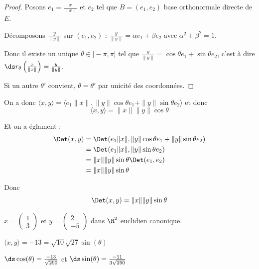 
\begin{proof}
    Posons $e_1 = \frac x {\| x \|}$ et $e_2$ tel que $B = (e_1, e_2)$ base orthonormale directe de $E$.

    Décomposons $\frac y {\| y \|}$ sur $(e_1, e_2)$ : 
    $\frac y {\| y \|} = \alpha e_1 + \beta e_2$ avec $\alpha^2 + \beta^2 = 1$.

    Donc il existe un unique $\theta \in ]- \pi, \pi]$ tel que $\frac y {\| y \|} = \cos \theta e_1 + \sin \theta e_2$, 
    c'est à dire $\ds r_\theta\left( \frac x {\| x \|} \right) = \frac y {\| y \|}$.

    Si un autre $\theta'$ convient, $\theta = \theta'$ par unicité des coordonnées. 
\end{proof}

On a donc $\langle x, y \rangle = \langle e_1 \| x \|, \| y \| \cos \theta e_1 + \| y \| \sin \theta e_2 \rangle$
et donc 
$$\langle x, y \rangle = \| x \| \| y \| \cos \theta$$

Et on a églament : 
\begin{align}
    \Det(x, y) & = \Det(e_1 \| x \|, \| y \| \cos \theta e_1 + \| y \| \sin \theta e_2) \\
    & = \Det(e_1 \| x \|, \| y \| \sin \theta e_2) \\
    & = \| x \| \| y \| \sin \theta \Det(e_1, e_2) \\
    & = \| x \| \| y \| \sin \theta
\end{align}

Donc 
$$\Det(x, y) = \| x \| \| y \| \sin \theta$$

\begin{exemple}
    $x = \begin{pmatrix}
        1 \\ 3
    \end{pmatrix}$ et $y = \begin{pmatrix}
        2 \\ -5
    \end{pmatrix}$ dans $\R^2$ euclidien canonique.

    $\langle x, y \rangle = -13 = \sqrt {10} \sqrt{27} \sin(\theta)$

    $\ds \cos(\theta) = \frac{- 13}{\sqrt{290}}$ et $\ds \sin(\theta) = \frac{- 11}{3\sqrt{290}}$
\end{exemple}

